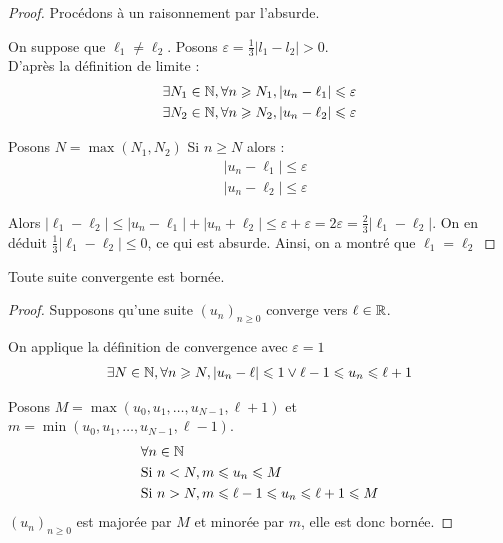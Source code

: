 \begin{proof}
         \par Procédons à un raisonnement par l'absurde. \\
         \par \noindent On suppose que $\ell_1 \neq \ell_2$. Posons $\varepsilon = \frac{1}{3} |l_1 - l_2| > 0$. \\
         D'après la définition de limite :
         \begin{align*}
             &\exists N_1 \in \mathbb{N}, \forall n \geqslant N_1, |u_n - \ell_1| \leqslant \varepsilon \\
             &\exists N_2 \in \mathbb{N}, \forall n \geqslant N_2, |u_n - \ell_2| \leqslant \varepsilon
         \end{align*}
         \par \noindent Posons $N = \max(N_1, N_2)$ Si $n \geq N$ alors :
         \begin{align*}
             &|u_n - \ell_1| \leq \varepsilon \\
             &|u_n - \ell_2| \leq \varepsilon
         \end{align*}
         \par \noindent Alors $|\ell_1 - \ell_2| \leq |u_n - \ell_1| + |u_n + \ell_2| \leq \varepsilon + \varepsilon = 2\varepsilon = \frac{2}{3}|\ell_1 - \ell_2|$.
    On en déduit $\frac{1}{3}|\ell_1 - \ell_2| \leq 0$, ce qui est absurde. Ainsi, on a montré que $\ell_1 = \ell_2$
\end{proof}

\begin{graybox}
    \begin{theoreme}[]
    Toute suite convergente est bornée.
\end{theoreme}
\end{graybox}

\begin{proof}
        \par \noindent Supposons qu'une suite $(u_n)_{n \geq 0}$ converge vers $\ell \in \mathbb{R}$. 
        \par \noindent On applique la définition de convergence avec $\varepsilon = 1$
        \begin{align*}
            \exists N \in \mathbb{N}, \forall n \geqslant N, |u_n - \ell| \leqslant 1 \vee \ell - 1 \leqslant u_n \leqslant \ell + 1
        \end{align*}
        \par \noindent Posons $M = \max(u_0, u_1, \ldots, u_{N - 1}, \ell + 1)$ et $m = \min(u_0, u_1, \ldots, u_{N -1}, \ell - 1)$.
        \begin{align*}
            &\forall n \in \mathbb{N} \\
            &\textnormal{Si } n < N, m \leqslant u_n \leqslant M \\
            &\textnormal{Si } n > N, m \leqslant \ell - 1 \leqslant u_n \leqslant \ell + 1 \leqslant M
        \end{align*}
        $(u_n)_{n \geq 0}$ est majorée par $M$ et minorée par $m$, elle est donc bornée.
    \end{proof}

